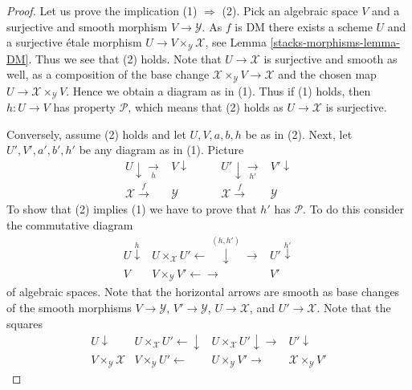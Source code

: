 \begin{proof}
Let us prove the implication (1) $\Rightarrow$ (2). Pick an algebraic
space $V$ and a surjective and smooth morphism $V \to \mathcal{Y}$.
As $f$ is DM there exists a scheme $U$ and a surjective \'etale morphism
$U \to V \times_\mathcal{Y} \mathcal{X}$, see
Lemma \ref{stacks-morphisms-lemma-DM}. Thus we see that (2) holds.
Note that $U \to \mathcal{X}$ is surjective and smooth as well, as a
composition of the base change
$\mathcal{X} \times_\mathcal{Y} V \to \mathcal{X}$ and the chosen
map $U \to \mathcal{X} \times_\mathcal{Y} V$. Hence we obtain a
diagram as in (1). Thus if (1) holds, then $h : U \to V$ has property
$\mathcal{P}$, which means that (2) holds as $U \to \mathcal{X}$ is surjective.

\medskip\noindent
Conversely, assume (2) holds and let $U, V, a, b, h$ be as in (2).
Next, let $U', V', a', b', h'$ be any diagram as in (1).
Picture
$$
\begin{array}{cc}U \downarrow\underset{h}{\longrightarrow} & V \downarrow \\ \mathcal{X} \overset{f}{\longrightarrow} & \mathcal{Y}\end{array}
\quad\quad
\begin{array}{cc}U' \downarrow\underset{h'}{\longrightarrow} & V' \downarrow \\ \mathcal{X} \overset{f}{\longrightarrow} & \mathcal{Y}\end{array}
$$
To show that (2) implies (1) we have to prove that $h'$ has $\mathcal{P}$.
To do this consider the commutative diagram
$$
\begin{array}{ccc}U \overset{h}{\downarrow} & U \times_\mathcal{X} U' \longleftarrow\overset{(h, h')}{\downarrow}\longrightarrow & U' \overset{h'}{\downarrow} \\ V & V \times_\mathcal{Y} V' \longleftarrow\longrightarrow & V'\end{array}
$$
of algebraic spaces. Note that the horizontal arrows are
smooth as base changes of the smooth morphisms
$V \to \mathcal{Y}$, $V' \to \mathcal{Y}$, $U \to \mathcal{X}$, and
$U' \to \mathcal{X}$. Note that the squares
$$
\begin{array}{cccc}U \downarrow & U \times_\mathcal{X} U' \longleftarrow\downarrow & U \times_\mathcal{X} U' \downarrow\longrightarrow & U' \downarrow \\ V \times_\mathcal{Y} \mathcal{X} & V \times_\mathcal{Y} U' \longleftarrow & U \times_\mathcal{Y} V' \longrightarrow & \mathcal{X} \times_\mathcal{Y} V'\end{array}
$$
\end{proof}
